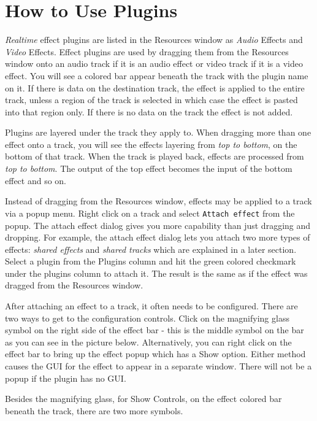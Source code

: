 \section{How to Use Plugins}%
\label{sec:how_use_plugins}

\textit{Realtime} effect plugins are listed in the Resources window as \textit{Audio} Effects and \textit{Video} Effects. Effect plugins are used by dragging them from the Resources window onto an audio track if it is an audio effect or video track if it is a video effect. You will see a colored bar appear beneath the track with the plugin name on it. If there is data on the destination track, the effect is applied to the entire track, unless a region of the track is selected in which case the effect is pasted into that region only. If there is no data on the track the effect is not added.

Plugins are layered under the track they apply to. When dragging more than one effect onto a track, you will see the effects layering from \textit{top to bottom}, on the bottom of that track. When the track is played back, effects are processed from \textit{top to bottom}. The output of the top effect becomes the input of the bottom effect and so on.

Instead of dragging from the Resources window, effects may be applied to a track via a popup menu. Right click on a track and select \texttt{Attach effect} from the popup. The attach effect dialog gives you more capability than just dragging and dropping. For example, the attach effect dialog lets you attach two more types of effects: \textit{shared effects} and \textit{shared tracks} which are explained in a later section. Select a plugin from the Plugins column and hit the green colored checkmark under the plugins column to attach it. The result is the same as if the effect was dragged from the Resources window.

After attaching an effect to a track, it often needs to be configured. There are two ways to get to the configuration controls. Click on the magnifying glass symbol on the right side of the effect bar - this is the middle symbol on the bar as you can see in the picture below. Alternatively, you can right click on the effect bar to bring up the effect popup which has a Show option. Either method causes the GUI for the effect to appear in a separate window. There will not be a popup if the plugin has no GUI.


Besides the magnifying glass, for Show Controls, on the effect colored bar beneath the track, there are two more symbols.

